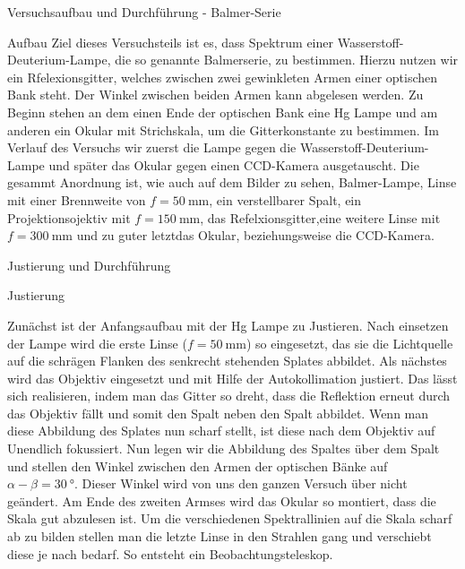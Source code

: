 \documentclass[pdftex, a4paper,11pt, twoside, ngerman]{report}
\begin{document}
  \begin{chapter}{Versuchsaufbau und Durchführung - Balmer-Serie}
  
  
  
    \begin{section}{Aufbau}
      Ziel dieses Versuchsteils ist es, dass Spektrum einer Wasserstoff-Deuterium-Lampe, die so genannte Balmerserie, zu bestimmen.
      Hierzu nutzen wir ein Rfelexionsgitter, welches zwischen zwei gewinkleten Armen einer optischen Bank steht.
      Der Winkel zwischen beiden Armen kann abgelesen werden.
      Zu Beginn stehen an dem einen Ende der optischen Bank eine Hg Lampe und am anderen ein Okular mit Strichskala, um die Gitterkonstante zu bestimmen. 
      Im Verlauf des Versuchs wir zuerst die Lampe gegen die Wasserstoff-Deuterium-Lampe und später das Okular gegen einen CCD-Kamera ausgetauscht.
      Die gesammt Anordnung ist, wie auch auf dem Bilder zu sehen, Balmer-Lampe, Linse mit einer Brennweite von $f=\SI{50}{\milli\meter}$, ein verstellbarer Spalt, ein Projektionsojektiv mit $f=\SI{150}{\milli\meter}$, das Refelxionsgitter,eine weitere Linse mit $f=\SI{300}{\milli\meter}$ und zu guter letztdas Okular, beziehungsweise die CCD-Kamera.

    \end{section}
    
    \begin{section}{Justierung und Durchführung}
      
      \begin{subsection}{Justierung}

        Zunächst ist der Anfangsaufbau mit der Hg Lampe zu Justieren. Nach einsetzen der Lampe wird die erste Linse ($f=\SI{50}{\milli\meter}$) so eingesetzt, das sie die Lichtquelle auf die schrägen Flanken des senkrecht stehenden Splates abbildet. Als nächstes wird das Objektiv eingesetzt und mit Hilfe der Autokollimation justiert. Das lässt sich realisieren, indem man das Gitter so dreht, dass die Reflektion erneut durch das Objektiv fällt und somit den Spalt neben den Spalt abbildet. Wenn man diese Abbildung des Splates nun scharf stellt, ist diese nach dem Objektiv auf Unendlich fokussiert. Nun legen wir die Abbildung des Spaltes über dem Spalt und stellen den Winkel zwischen den Armen der optischen Bänke auf $\alpha-\beta = \SI{30}{\degree}$. Dieser Winkel wird von uns den ganzen Versuch über nicht geändert. Am Ende des zweiten Armses wird das Okular so montiert, dass die Skala gut abzulesen ist. Um die verschiedenen Spektrallinien auf die Skala scharf ab zu bilden stellen man die letzte Linse in den Strahlen gang und verschiebt diese je nach bedarf. So entsteht ein Beobachtungsteleskop.


\end{subsection}
\end{section}
\end{chapter}
\end{document}
